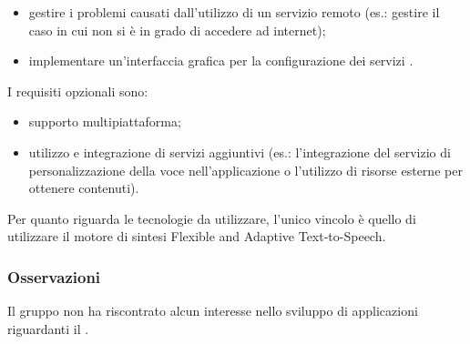 \begin{itemize}
	\item gestire i problemi causati dall'utilizzo di un servizio remoto (es.: gestire il caso in cui non si è in grado di accedere ad internet);
	\item implementare un'interfaccia grafica per la configurazione dei servizi .
\end{itemize}

I requisiti opzionali sono:

\begin{itemize}
	\item supporto multipiattaforma;
	\item utilizzo e integrazione di servizi aggiuntivi (es.: l'integrazione del servizio di personalizzazione
	della voce nell'applicazione o l'utilizzo di risorse esterne per ottenere contenuti).
\end{itemize}

Per quanto riguarda le tecnologie da utilizzare, l'unico vincolo è quello di utilizzare il motore di sintesi Flexible and Adaptive Text-to-Speech.

\subsubsection{Osservazioni}
Il gruppo non ha riscontrato alcun interesse nello sviluppo di applicazioni riguardanti il .
